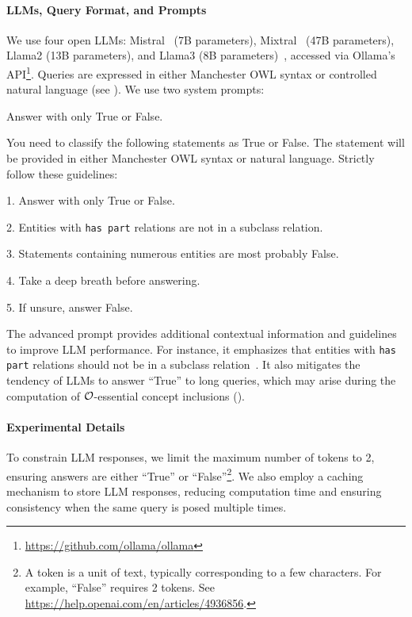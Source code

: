\paragraph{LLMs, Query Format, and Prompts}
We use four open \glspl{LLM}: Mistral~\cite{mistral} (7B parameters), Mixtral~\cite{mixtral} (47B parameters), Llama2 (13B parameters), and Llama3 (8B parameters)~\cite{llama2}, accessed via Ollama's API\footnote{\url{https://github.com/ollama/ollama}}.
%
Queries are expressed in either Manchester OWL syntax or controlled natural language (see ).
%
We use two system prompts:
%
\begin{promptbox}
    \scriptsize
    Answer with only True or False.
\end{promptbox}
%
\begin{promptbox}
    \scriptsize
    You need to classify the following statements as True or False. The statement will be provided in either Manchester OWL syntax or natural language. Strictly follow these guidelines:

    1. Answer with only True or False.

    2. Entities with \texttt{has part} relations are not in a subclass relation.

    3. Statements containing numerous entities are most probably False.

    4. Take a deep breath before answering.

    5. If unsure, answer False.
\end{promptbox}
%
The advanced prompt provides additional contextual information and guidelines to improve \gls{LLM} performance.
%
For instance, it emphasizes that entities with \texttt{has part} relations should not be in a subclass relation~\cite{funk2023ontology}.
%
It also mitigates the tendency of \glspl{LLM} to answer ``True'' to long queries, which may arise during the computation of \(\mathcal{O}\)-essential concept inclusions ().
%

\paragraph{Experimental Details}
To constrain \gls{LLM} responses, we limit the maximum number of tokens to 2, ensuring answers are either ``True'' or ``False''\footnote{A token is a unit of text, typically corresponding to a few characters. For example, ``False'' requires 2 tokens. See \url{https://help.openai.com/en/articles/4936856}.}.
%
We also employ a caching mechanism to store \gls{LLM} responses, reducing computation time and ensuring consistency when the same query is posed multiple times.



